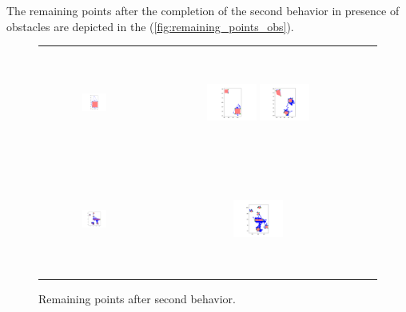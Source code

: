 The remaining points after the completion of the second behavior in presence of obstacles are depicted in the (\autoref{fig:remaining_points_obs}). 

\begin{figure}[H]
    \centering
    \begin{tabular}{ccc} 
         \includegraphics[height=36mm,width=0.24\textwidth]{Images/simulation_obs/left_points_near_obs/1.png}
        & \includegraphics[height=36mm,width=0.24\textwidth]{Images/simulation_obs/left_points_near_obs/2.png}
         \includegraphics[height=36mm,width=0.24\textwidth]{Images/simulation_obs/left_points_near_obs/3.png}\\[-4pt]

        \includegraphics[height=36mm,width=0.24\textwidth]{Images/simulation_obs/left_points_near_obs/4.png}
        & \includegraphics[height=36mm,width=0.24\textwidth]{Images/simulation_obs/left_points_near_obs/5.png} 

    \end{tabular}
    \caption{Remaining points after second behavior.\label{fig:remaining_points_obs}} 
\end{figure}

